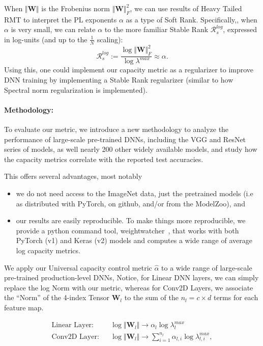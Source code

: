 When $\Vert\mathbf{W}\Vert$ is the Frobenius norm $\Vert\mathbf{W}\Vert^{2}_{F}$, we can use results of Heavy Tailed RMT to interpret the PL
exponents $\alpha$ as a type of Soft Rank.  Specifically,, when $\alpha$ is very small, we can relate $\alpha$ to the more familiar
 Stable Rank $\mathcal{R}^{log}_{s}$, expressed in log-units (and up to the $\frac{1}{N}$ scaling):
 \begin{equation}
 \mathcal{R}^{log}_{s}:=\dfrac{\log\Vert\mathbf{W}\Vert^{2}_{F}}{\log\lambda^{max}}  \approx \alpha  .
\end{equation}
Using this, one could implement our capacity metric as a regularizer to improve DNN training by
implementing a Stable Rank regularizer (similar to how Spectral norm regularization is implemented).


\paragraph{Methodology:} To evaluate our metric, we introduce a new methodology to analyze the performance of large-scale pre-trained DNNs, 
 including the VGG and ResNet series of models, as well nearly 200 other widely available models, and study how the capacity metrics correlate with the reported test accuracies.
 
 This offers several advantages, most notably
 \begin{itemize}
 \item we do not need access to the ImageNet data, just the pretrained models (i.e as distributed with PyTorch, on github, and/or from the ModelZoo), and
 \item our results are easily reproducible.      To make things more reproducible, we provide a python command tool, weightwatcher~\cite{weightwatcher_pagkage}, 
  that works with both  PyTorch (v1) and Keras (v2) models and computes a wide range of average log capacity metrics.
 \end{itemize}
 
We apply our Universal capacity control metric $\hat{\alpha}$ to a wide range of large-scale pre-trained production-level DNNs,
Notice, for Linear DNN layers, we can simply replace the log Norm with our metric, whereas for Conv2D Layers, we associate 
the ``Norm'' of the 4-index Tensor $\mathbf{W}_{l}$ to the sum of the $n_{l}=c\times d$ terms for each feature map.

\begin{eqnarray*}
\text{Linear Layer:} & & \log\Vert\mathbf{W}_{l}\Vert
\rightarrow 
\alpha_{l}\log\lambda_{l}^{max}  \\
\text{Conv2D Layer:} & & \log\Vert\mathbf{W}_{l}\Vert
\rightarrow 
\sum_{i=1}^{n_{l}}\alpha_{l,i} \log\lambda_{l,i}^{max} , 
\end{eqnarray*}

